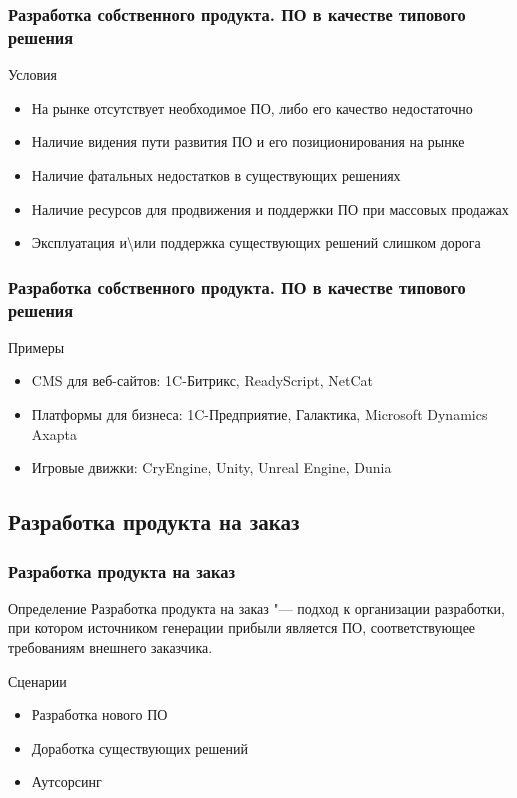 \documentclass{../industrial-development}
\begin{document}
\begin{frame} \frametitle{Разработка собственного продукта. ПО в качестве типового решения}
	\begin{block}{Условия}
		\begin{itemize}
			\item На рынке отсутствует необходимое ПО, либо его качество недостаточно
			\item Наличие видения пути развития ПО и его позиционирования на рынке
			\item Наличие фатальных недостатков в существующих решениях
			\item Наличие ресурсов для продвижения и поддержки ПО при массовых продажах
			\item Эксплуатация и\textbackslash или поддержка существующих решений слишком дорога
		\end{itemize}
	\end{block}
\end{frame}
\lecturenotes


\begin{frame} \frametitle{Разработка собственного продукта. ПО в качестве типового решения}
	\begin{block}{Примеры}
		\begin{itemize}
			\item CMS для веб-сайтов: 1C-Битрикс, ReadyScript, NetCat
			\item Платформы для бизнеса: 1C-Предприятие, Галактика, Microsoft Dynamics Axapta
			\item Игровые движки: CryEngine, Unity, Unreal Engine, Dunia
		\end{itemize}
	\end{block}
\end{frame}
\lecturenotes


\subsection{Разработка продукта на заказ}


\begin{frame} \frametitle{Разработка продукта на заказ}
	\begin{block}{Определение}
		\alert{Разработка продукта на заказ} "--- подход к организации разработки, при котором источником генерации прибыли является ПО, соответствующее требованиям внешнего заказчика.
	\end{block}
	\begin{block}{Сценарии}
		\begin{itemize}
			\item Разработка нового ПО
			\item Доработка существующих решений
			\item Аутсорсинг
		\end{itemize}
	\end{block}
\end{frame}
\lecturenotes
\end{document}
